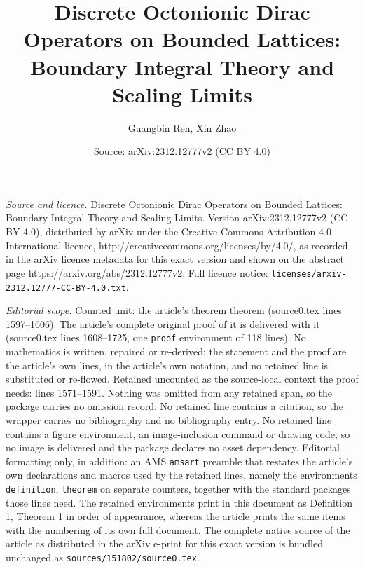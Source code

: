 \documentclass[10pt,a4paper]{amsart}
\title{Discrete Octonionic Dirac Operators on Bounded Lattices: Boundary Integral Theory and Scaling Limits}
\author{Guangbin Ren, Xin Zhao}
\date{Source: arXiv:2312.12777v2 (CC BY 4.0)}
\begin{document}
\maketitle

\noindent\emph{Source and licence.} Discrete Octonionic Dirac Operators on Bounded Lattices: Boundary Integral Theory and Scaling Limits. Version arXiv:2312.12777v2 (CC BY 4.0), distributed by arXiv under the Creative Commons Attribution 4.0 International licence, http://creativecommons.org/licenses/by/4.0/, as recorded in the arXiv licence metadata for this exact version and shown on the abstract page https://arxiv.org/abs/2312.12777v2. Full licence notice: \texttt{licenses/arxiv-2312.12777-CC-BY-4.0.txt}.\par\smallskip

\noindent\textit{Editorial scope.} Counted unit: the article's theorem theorem (source0.tex lines 1597--1606). The article's complete original proof of it is delivered with it (source0.tex lines 1608--1725, one \texttt{proof} environment of 118 lines). No mathematics is written, repaired or re-derived: the statement and the proof are the article's own lines, in the article's own notation, and no retained line is substituted or re-flowed.  Retained uncounted as the source-local context the proof needs: lines 1571--1591.  Nothing was omitted from any retained span, so the package carries no omission record.  No retained line contains a citation, so the wrapper carries no bibliography and no bibliography entry.  No retained line contains a figure environment, an image-inclusion command or drawing code, so no image is delivered and the package declares no asset dependency.  Editorial formatting only, in addition: an AMS \texttt{amsart} preamble that restates the article's own declarations and macros used by the retained lines, namely the environments \texttt{definition}, \texttt{theorem} on separate counters, together with the standard packages those lines need.  The retained environments print in this document as Definition 1, Theorem 1 in order of appearance, whereas the article prints the same items with the numbering of its own full document.  The complete native source of the article as distributed in the arXiv e-print for this exact version is bundled unchanged as \texttt{sources/151802/source0.tex}.
\end{document}
